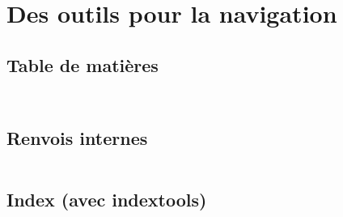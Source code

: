 \section[Naviguer]{Des outils pour la navigation}

\subsection{Table de matières}

\begin{slide}
  \inputminted{latex}{examples/toc.tex}
\end{slide}

\begin{slide}
  \inputminted{latex}{examples/minitoc.tex}
\end{slide}

\subsection{Renvois internes}
\begin{slide}
  \inputminted{latex}{examples/renvois.tex}
\end{slide}

\subsection{Index (avec indextools)}
\begin{slide}
  \inputminted{latex}{examples/index-def.tex}
\end{slide}

\begin{slide}
  \inputminted{latex}{examples/index-appel.tex}
\end{slide}

\begin{slide}
  \inputminted{latex}{examples/index-impression.tex}
\end{slide}



